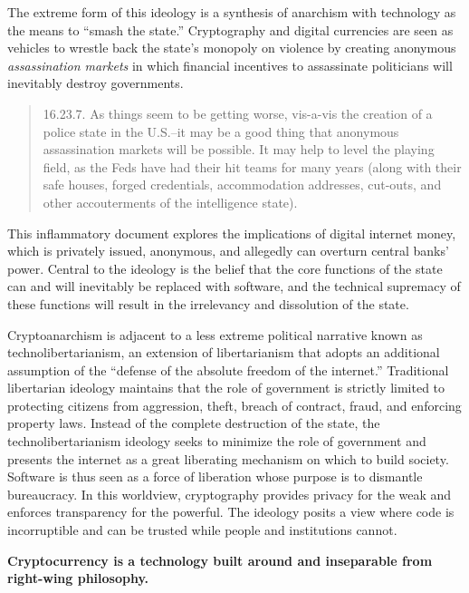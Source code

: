 The extreme form of this ideology is a synthesis of anarchism with technology as
the means to ``smash the state.'' Cryptography and digital currencies are seen
as vehicles to wrestle back the state's monopoly on violence by creating
anonymous \textit{assassination markets} in which financial incentives to
assassinate politicians will inevitably destroy governments.


\begin{quote}
16.23.7. As things seem to be getting worse, vis-a-vis the creation of a
police state in the U.S.--it may be a good thing that anonymous
assassination markets will be possible. It may help to level the playing
field, as the Feds have had their hit teams for many years (along with
their safe houses, forged credentials, accommodation addresses,
cut-outs, and other accouterments of the intelligence state).
\end{quote}

This inflammatory document explores the implications of digital internet money,
which is privately issued, anonymous, and allegedly can overturn central banks'
power. Central to the ideology is the belief that the core functions of the
state can and will inevitably be replaced with software, and the technical
supremacy of these functions will result in the irrelevancy and dissolution of
the state.

Cryptoanarchism is adjacent to a less extreme political narrative known as
technolibertarianism, an extension of libertarianism that adopts an additional
assumption of the ``defense of the absolute freedom of the internet.''
Traditional libertarian ideology maintains that the role of government is
strictly limited to protecting citizens from aggression, theft, breach of
contract, fraud, and enforcing property laws. Instead of the complete
destruction of the state, the technolibertarianism ideology seeks to minimize
the role of government and presents the internet as a great liberating mechanism
on which to build society.  Software is thus seen as a force of liberation whose
purpose is to dismantle bureaucracy. In this worldview, cryptography provides
privacy for the weak and enforces transparency for the powerful.
\cite{assange_cypherpunks_2016} The ideology posits a view where code is
incorruptible and can be trusted while people and institutions cannot.
\cite{krugman_brutal_2021}

\begin{infobox}
 \textbf{
    Cryptocurrency is a technology built around and inseparable from right-wing
    philosophy.
  }
\end{infobox}

